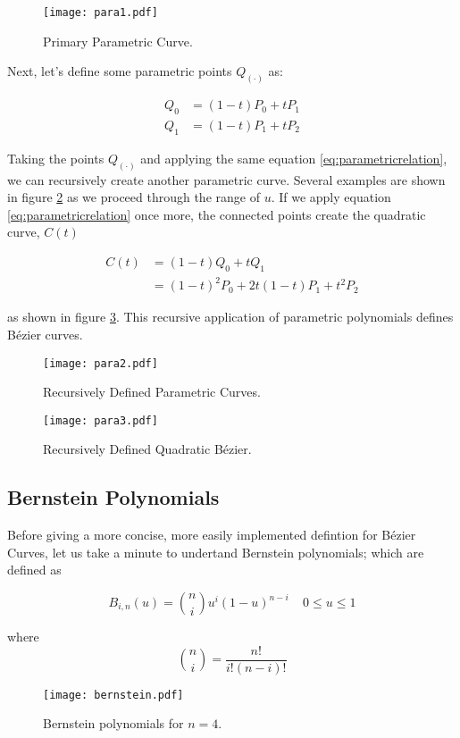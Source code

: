 \begin{figure}[htbp]
	\centering
	\texttt{[image: para1.pdf]}
	\caption{Primary Parametric Curve.}
	\label{fig:para1}
\end{figure}

Next, let's define some parametric points $Q_{(\cdot)}$ as:

\begin{align}
Q_0 &=  (1-t)P_0 + tP_1 \\
Q_1 &=  (1-t)P_1 + tP_2
 \end{align} 
 
Taking the points $Q_{(\cdot)}$ and applying the same equation \ref{eq:parametricrelation}, we can recursively create another parametric curve. Several examples are shown in figure \ref{fig:para2} as we proceed through the range of $u$. If we apply equation \ref{eq:parametricrelation} once more, the connected points create the quadratic curve, $C(t)$

\begin{align}
C(t) &= (1-t)Q_0 + tQ_1 \\
&= (1-t)^2P_0 + 2t(1-t)P_1+t^2P_2 
\end{align} 

as shown in figure \ref{fig:para3}. This recursive application of parametric polynomials defines Bézier curves.
 
 \begin{figure}[htbp]
 	\centering
 	\texttt{[image: para2.pdf]}
 	\caption{Recursively Defined Parametric Curves.}
 	\label{fig:para2}
 \end{figure}

 
\begin{figure}[htbp]
	\centering
	\texttt{[image: para3.pdf]}
	\caption{Recursively Defined Quadratic Bézier.}
	\label{fig:para3}
\end{figure}


\subsection{Bernstein Polynomials}
Before giving a more concise, more easily implemented defintion for Bézier Curves, let us take a minute to undertand Bernstein polynomials; which are defined as

$$ B_{i,n}(u) = {n\choose i} u^i (1-u)^{n-i} ~~~~~0\leq u \leq1 $$

where $$ {n\choose i} = \frac{n!}{i!(n-i)!} $$

\begin{figure}[htbp]
	\centering
	\texttt{[image: bernstein.pdf]}
	\caption{Bernstein polynomials for $n=4$.}
	\label{fig:bernstein}
\end{figure}

